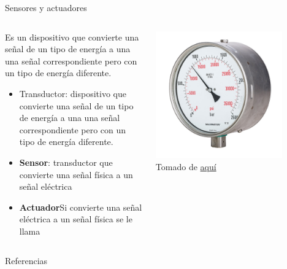 \documentclass[aspectratio=169]{beamer}
\begin{document}
\begin{frame}{Sensores y actuadores}
    \begin{columns}[c, onlytextwidth]
        \begin{column}{0.6\textwidth}
        Es un dispositivo que convierte una señal de un tipo de energía a una
        una señal correspondiente pero con un tipo de energía diferente.\\[8pt]
        \begin{itemize}
            \item Transductor: dispositivo que convierte una señal de un tipo de energía a una
            una señal correspondiente pero con un tipo de energía diferente.
            \item \textbf{Sensor}: transductor que convierte una señal física a un señal eléctrica
            \item \textbf{Actuador}Si convierte una señal eléctrica a un señal física se le llama 
        \end{itemize}
        \end{column}
        \begin{column}{0.4\textwidth}
            \begin{center}
               \includegraphics[width=0.8\textwidth]{fig/bourdon.jpg}\\
               \tiny{Tomado de \href{https://upload.wikimedia.org/wikipedia/commons/thumb/7/74/MAXIMATOR-High-Pressure-Manometer-01a.jpg/1200px-MAXIMATOR-High-Pressure-Manometer-01a.jpg}{aquí}}
            \end{center}
        \end{column}
    \end{columns}
\end{frame}



\begin{frame}{Referencias}


\footnotesize


\end{frame}
\end{document}
